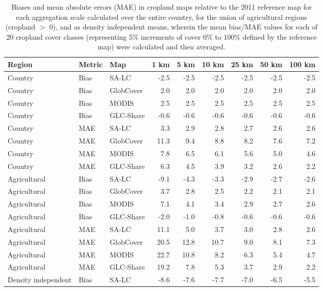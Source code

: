 \begin{longtable}{lllrrrrrr}
\caption{Biases and mean absolute errors (MAE) in cropland maps relative to the 2011 reference map for each aggregation scale calculated over the entire country, for the union of agricultural regions (cropland $>$ 0), and as density independent means, wherein the mean bias/MAE values for each of 20 cropland cover classes (representing 5\% increments of cover 0\% to 100\% defined by the reference map) were calculated and then averaged.} \\ 
  \hline
Region & Metric & Map & 1 km & 5 km & 10 km & 25 km & 50 km & 100 km \\ 
  \hline
Country & Bias & SA-LC & -2.5 & -2.5 & -2.5 & -2.5 & -2.5 & -2.5 \\ 
  Country & Bias & GlobCover & 2.0 & 2.0 & 2.0 & 2.0 & 2.0 & 2.0 \\ 
  Country & Bias & MODIS & 2.5 & 2.5 & 2.5 & 2.5 & 2.5 & 2.5 \\ 
  Country & Bias & GLC-Share & -0.6 & -0.6 & -0.6 & -0.6 & -0.6 & -0.6 \\ 
  Country & MAE & SA-LC & 3.3 & 2.9 & 2.8 & 2.7 & 2.6 & 2.6 \\ 
  Country & MAE & GlobCover & 11.3 & 9.4 & 8.8 & 8.2 & 7.6 & 7.2 \\ 
  Country & MAE & MODIS & 7.8 & 6.5 & 6.1 & 5.6 & 5.0 & 4.6 \\ 
  Country & MAE & GLC-Share & 6.3 & 4.5 & 3.9 & 3.2 & 2.6 & 2.2 \\ 
  Agricultural & Bias & SA-LC & -9.1 & -4.3 & -3.3 & -2.9 & -2.7 & -2.6 \\ 
  Agricultural & Bias & GlobCover & 3.7 & 2.8 & 2.5 & 2.2 & 2.1 & 2.1 \\ 
  Agricultural & Bias & MODIS & 7.1 & 4.1 & 3.4 & 2.9 & 2.7 & 2.6 \\ 
  Agricultural & Bias & GLC-Share & -2.0 & -1.0 & -0.8 & -0.6 & -0.6 & -0.6 \\ 
  Agricultural & MAE & SA-LC & 11.1 & 5.0 & 3.7 & 3.0 & 2.8 & 2.6 \\ 
  Agricultural & MAE & GlobCover & 20.5 & 12.8 & 10.7 & 9.0 & 8.1 & 7.3 \\ 
  Agricultural & MAE & MODIS & 22.7 & 10.8 & 8.2 & 6.3 & 5.4 & 4.7 \\ 
  Agricultural & MAE & GLC-Share & 19.2 & 7.8 & 5.3 & 3.7 & 2.9 & 2.2 \\ 
  Density independent & Bias & SA-LC & -8.6 & -7.6 & -7.7 & -7.0 & -6.5 & -5.5 \\ 

\end{longtable}

